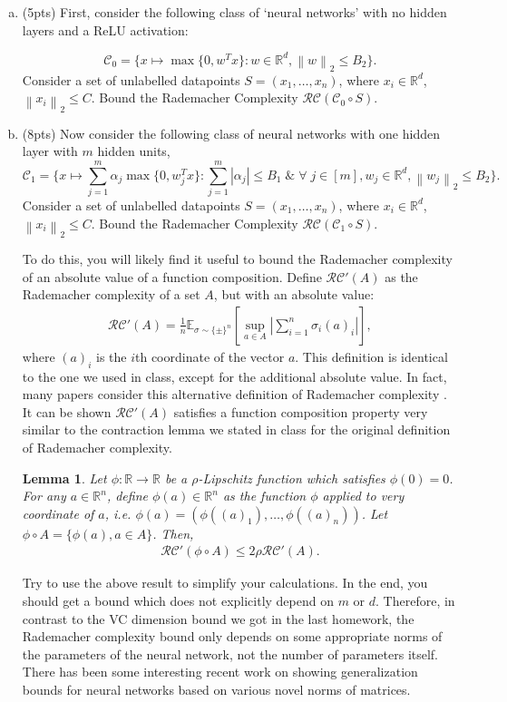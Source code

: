\documentclass[11pt]{article}
\newcommand{\calC}{{\mathcal{C}}}
\newcommand{\E}{\mathbb{E}}
\newcommand{\blue}[1]{{\color{blue}#1}}
\newcommand{\R}{\mathbb{R}}
\newcommand{\rc}{\mathcal{RC}}
\newcommand{\twonorm}[1]{\left\| #1\right\|_2}
\newtheorem{lemma}[theorem]{Lemma}
\begin{document}
\begin{enumerate}[(a)] 

\item (\blue{5pts}) First, consider the following class of `neural networks' with no hidden layers and a ReLU activation:

\[
\calC_0 = \{ x \mapsto \max\{0,w^Tx\}: w \in \R^d, \twonorm{w}\le B_2 \}.
\]
Consider a set of unlabelled datapoints $S=(x_1,\dots, x_n)$, where $x_i \in \R^d$, $\twonorm{x_i}\le C$. Bound the Rademacher Complexity $\rc(\calC_0 \circ S) $.

\item (\blue{8pts}) Now consider the following class of neural networks with one hidden layer with $m$ hidden units,
\[
\calC_1 = \{ x \mapsto \sum_{j=1}^m \alpha_j\max\{0,w_j^Tx\}: \sum_{j=1}^m |\alpha_j| \le B_1 \;\& \;\forall\; j \in [m], w_j \in \R^d,  \twonorm{w_j}\le B_2 \}.
\]
Consider a set of unlabelled datapoints $S=(x_1,\dots, x_n)$, where $x_i \in \R^d$, $\twonorm{x_i}\le C$. Bound the Rademacher Complexity $\rc(\calC_1 \circ S) $.

To do this, you will likely find it useful to bound the Rademacher complexity of an absolute value of a function composition. Define $\rc'(A)$ as the Rademacher complexity of a set $A$, but with an absolute value:
\begin{align*}
    \rc'(A) = \frac{1}{n}\E_{\sigma\sim \{\pm\}^n} \left[\sup_{a\in A} \left|\sum_{i=1}^n \sigma_i(a)_i\right|\right],
\end{align*}
where $(a)_i$ is the $i$th coordinate of the vector $a$. This definition is identical to the one we used in class, except for the additional absolute value. In fact, many papers consider this alternative definition of Rademacher complexity \cite{bartlett2002rademacher}. It can be shown $\rc'(A)$ satisfies a function composition property very similar to the contraction lemma we stated in class for the original definition of Rademacher complexity. 

\begin{lemma}\cite{bartlett2002rademacher}
Let $\phi:\R\rightarrow \R$ be a $\rho$-Lipschitz function  which satisfies $\phi(0)=0$. For any $a\in \R^n$, define $\phi(a)\in \R^n$ as the function $\phi$ applied to very coordinate of $a$, i.e. $\phi(a)=(\phi((a)_1),\dots,\phi((a)_n))$. Let $\phi \circ A = \{ \phi(a), a \in A\}$. Then,
\begin{align*}
    \rc'(\phi \circ A) \le 2\rho \rc'(A).
\end{align*}

\end{lemma}
Try to use the above result to simplify your calculations. In the end, you should get a bound which does not explicitly depend on $m$ or $d$. Therefore, in contrast to the VC dimension bound we got in the last homework, the Rademacher complexity bound only depends on some appropriate norms of the parameters of the neural network, not the number of parameters itself. There has been some interesting recent work \cite{bartlett2017spectrally,arora2018stronger,neyshabur2017pac} on showing generalization bounds for neural networks based on various novel norms of matrices.

\end{enumerate}
\end{document}
